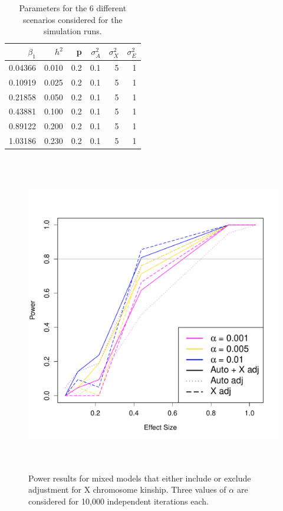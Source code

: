 \documentclass[11pt]{article} %
\begin{document}
\begin{table}[ht]
\centering
\begin{tabular}{rrrrrr}
  \hline
 $\beta_1$ & $h^2$ & p & $\sigma^2_A$ & $\sigma^2_X$ & $\sigma^2_E$ \\ 
  \hline
0.04366 & 0.010 & 0.2 & 0.1 & 5 & 1 \\ 
 0.10919 & 0.025 & 0.2 & 0.1 & 5 & 1 \\ 
 0.21858 & 0.050 & 0.2 & 0.1 & 5 & 1 \\ 
0.43881 & 0.100 & 0.2 & 0.1 & 5 & 1 \\ 
 0.89122 & 0.200 & 0.2 & 0.1 & 5 & 1 \\ 
 1.03186 & 0.230 & 0.2 & 0.1 & 5 & 1 \\ 
   \hline
\end{tabular}
\caption{Parameters for the 6 different scenarios considered for the simulation runs.}
\end{table}

\begin{figure}
\centering
\includegraphics[height=14cm]{powerRes_10000Iters.pdf}
\caption{Power results for mixed models that either include or exclude adjustment for X chromosome kinship. 
Three values of $\alpha$ are considered for 10,000 independent iterations each.}
\end{figure}
\end{document}
